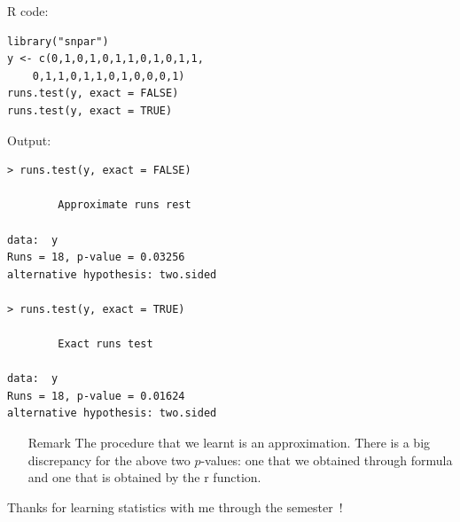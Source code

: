 \begin{frame}[fragile]
	\begin{minipage}{0.45\textwidth}
			R code:
		\begin{lstlisting}
library("snpar")
y <- c(0,1,0,1,0,1,1,0,1,0,1,1,
	0,1,1,0,1,1,0,1,0,0,0,1)
runs.test(y, exact = FALSE)
runs.test(y, exact = TRUE)
		\end{lstlisting}
	\end{minipage}
	\hfill
	\begin{minipage}{0.45\textwidth}
Output:
\begin{lstlisting}
> runs.test(y, exact = FALSE)

        Approximate runs rest

data:  y
Runs = 18, p-value = 0.03256
alternative hypothesis: two.sided

> runs.test(y, exact = TRUE)

        Exact runs test

data:  y
Runs = 18, p-value = 0.01624
alternative hypothesis: two.sided
\end{lstlisting}
	\end{minipage}
\vfill
%
%
%
%
%
%
\begin{itemize}
		\item[Remark] The procedure that we learnt is an approximation. There is a big discrepancy for the above two $p$-values:
			one that we obtained through formula and one that is obtained by the r function.
	\end{itemize}
\end{frame}
\begin{frame}[fragile]
\begin{center}
\begin{minipage}{0.6\textwidth}
\centering
\huge
Thanks for learning statistics with me through the semester~!
\end{minipage}
\end{center}
\end{frame}
